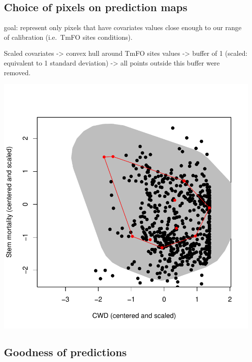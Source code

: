\documentclass[]{elsarticle} %
\makeatletter
\def\maxwidth{\ifdim\Gin@nat@width>\linewidth\linewidth
\else\Gin@nat@width\fi}
\let\Oldincludegraphics\includegraphics
\renewcommand{\includegraphics}[1]{\Oldincludegraphics[width=\maxwidth]{#1}}
\makeatother
\begin{document}
\subsection{Choice of pixels on prediction
maps}\label{choice-of-pixels-on-prediction-maps}

goal: represent only pixels that have covariates values close enough to
our range of calibration (i.e.~TmFO sites conditions).

Scaled covariates -\textgreater{} convex hull around TmFO sites values
-\textgreater{} buffer of 1 (scaled: equivalent to 1 standard deviation)
-\textgreater{} all points outside this buffer were removed.

\includegraphics{rticle_tmfo_functional_files/figure-latex/pixel_choice-1.pdf}

\subsection{Goodness of predictions}\label{goodness-of-predictions}
\end{document}
